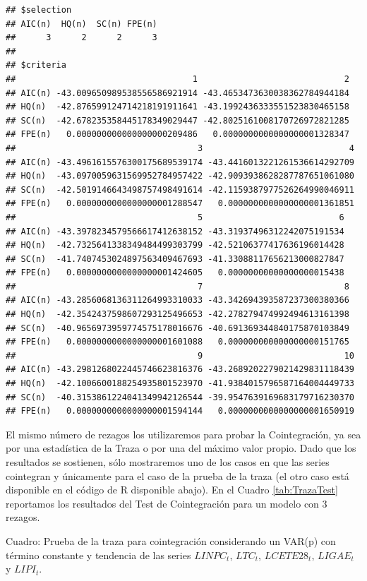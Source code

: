 \documentclass[
]{book}
\begin{document}
\begin{verbatim}
## $selection
## AIC(n)  HQ(n)  SC(n) FPE(n) 
##      3      2      2      3 
## 
## $criteria
##                                   1                             2
## AIC(n) -43.009650989538556586921914 -43.4653473630038362784944184
## HQ(n)  -42.876599124714218191911641 -43.1992436333551523830465158
## SC(n)  -42.678235358445178349029447 -42.8025161008170726972821285
## FPE(n)   0.000000000000000000209486   0.0000000000000000001328347
##                                    3                             4
## AIC(n) -43.4961615576300175689539174 -43.4416013221261536614292709
## HQ(n)  -43.0970059631569952784957422 -42.9093938628287787651061080
## SC(n)  -42.5019146643498757498491614 -42.1159387977526264990046911
## FPE(n)   0.0000000000000000001288547   0.0000000000000000001361851
##                                    5                           6
## AIC(n) -43.3978234579566617412638152 -43.31937496312242075191534
## HQ(n)  -42.7325641338349484499303799 -42.52106377417636196014428
## SC(n)  -41.7407453024897563409467693 -41.33088117656213000827847
## FPE(n)   0.0000000000000000001424605   0.00000000000000000015438
##                                    7                            8
## AIC(n) -43.2856068136311264993310033 -43.342694393587237300380366
## HQ(n)  -42.3542437598607293125496653 -42.278279474992494613161398
## SC(n)  -40.9656973959774575178016676 -40.691369344840175870103849
## FPE(n)   0.0000000000000000001601088   0.000000000000000000151765
##                                    9                            10
## AIC(n) -43.2981268022445746623816376 -43.2689202279021429831118439
## HQ(n)  -42.1006600188254935801523970 -41.9384015796587164004449733
## SC(n)  -40.3153861224041349942126544 -39.9547639169683179716230370
## FPE(n)   0.0000000000000000001594144   0.0000000000000000001650919
\end{verbatim}

El mismo número de rezagos los utilizaremos para probar la
Cointegración, ya sea por una estadística de la Traza o por una del
máximo valor propio. Dado que los resultados se sostienen, sólo
mostraremos uno de los casos en que las series cointegran y únicamente
para el caso de la prueba de la traza (el otro caso está disponible en
el código de R disponible abajo). En el Cuadro \ref{tab:TrazaTest}
reportamos los resultados del Test de Cointegración para un modelo con 3
rezagos.

Cuadro: \label{tab:TrazaTest} Prueba de la traza para cointegración
considerando un VAR(p) con término constante y tendencia de las series
\(LINPC_t\), \(LTC_t\), \(LCETE28_t\), \(LIGAE_t\) y \(LIPI_t\).
\end{document}
